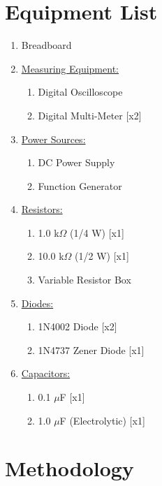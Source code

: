 \documentclass[twocolumn,english]{IEEEtran}
\begin{document}
\section{Equipment List}
\begin{enumerate}
  \item Breadboard
  \item \underline {Measuring Equipment:}
    \begin{enumerate}
      \item Digital Oscilloscope
      \item Digital Multi-Meter \hfill[x2]
    \end{enumerate}
  \item \underline {Power Sources:}
    \begin{enumerate}
    \item DC Power Supply
    \item Function Generator
    \end{enumerate}
  \item \underline{Resistors:}
    \begin{enumerate}
    \item 1.0 k$\Omega$ (1/4 W) \hfill[x1]
    \item 10.0 k$\Omega$ (1/2 W) \hfill[x1]
    \item Variable Resistor Box
    \end{enumerate}
  \item \underline{Diodes:}
    \begin{enumerate}
     \item 1N4002 Diode \hfill[x2]
     \item 1N4737 Zener Diode \hfill[x1]
    \end{enumerate}
  \item \underline{Capacitors:}
    \begin{enumerate}
     \item 0.1 $\mu$F \hfill[x1]
     \item 1.0 $\mu$F (Electrolytic) \hfill[x1]
    \end{enumerate}
\end{enumerate}

\section{Methodology}
\end{document}
